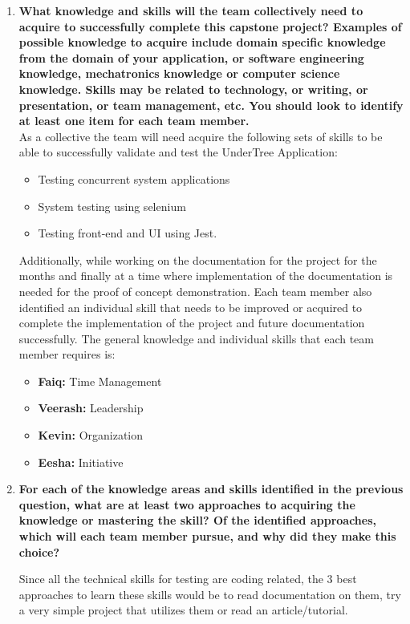 \documentclass[12pt, titlepage]{article}
\begin{document}
	\begin{enumerate}
		\item \textbf{What knowledge and skills will the team collectively need to acquire to
			successfully complete this capstone project?  Examples of possible knowledge
			to acquire include domain specific knowledge from the domain of your
			application, or software engineering knowledge, mechatronics knowledge or
			computer science knowledge.  Skills may be related to technology, or writing,
			or presentation, or team management, etc.  You should look to identify at
			least one item for each team member.}\\
		
		As a collective the team will need acquire the following sets of skills to be able to successfully validate and test the UnderTree Application:
		\begin{itemize}
			\item Testing concurrent system applications
			\item System testing using selenium
			\item Testing front-end and UI using Jest.
		\end{itemize}
		
		Additionally, while working on the documentation for the project for the months and finally at a time where implementation of the documentation is needed for the proof of concept demonstration. Each team member also identified an individual skill that needs to be improved or acquired to complete the implementation of the project and future documentation successfully. The general knowledge and individual skills that each team member requires is:
		
		\begin{itemize}
			\item \textbf{Faiq:} Time Management
			\item \textbf{Veerash:} Leadership
			\item \textbf{Kevin:} Organization
			\item \textbf{Eesha:} Initiative
		\end{itemize}
		
		
		\item \textbf{For each of the knowledge areas and skills identified in the previous
			question, what are at least two approaches to acquiring the knowledge or
			mastering the skill?  Of the identified approaches, which will each team
			member pursue, and why did they make this choice?}
		
		Since all the technical skills for testing are coding related, the 3 best approaches to learn these skills would be to read documentation on them, try a very simple project that utilizes them or read an article/tutorial.
		

\end{enumerate}
\end{document}
